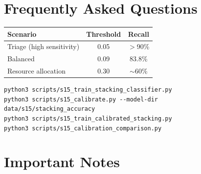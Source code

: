 \documentclass[11pt,a4paper]{article}
\renewcommand{\arraystretch}{1.3}
\begin{document}
\section{Frequently Asked Questions}

\begin{tcolorbox}[
    enhanced,
    colback=white,
    colframe=secondary,
    title={\faQuestionCircle\hspace{0.5em}Operating Threshold Selection},
    fonttitle=\bfseries\color{white},
    colbacktitle=secondary,
]
\begin{center}
\renewcommand{\arraystretch}{1.3}
\begin{tabular}{lcc}
\toprule
\textbf{Scenario} & \textbf{Threshold} & \textbf{Recall} \\
\midrule
Triage (high sensitivity) & 0.05 & $>$90\% \\
Balanced & 0.09 & 83.8\% \\
Resource allocation & 0.30 & $\sim$60\% \\
\bottomrule
\end{tabular}
\end{center}
\end{tcolorbox}

\vspace{0.5cm}

\begin{tcolorbox}[
    enhanced,
    colback=white,
    colframe=accent,
    title={\faWrench\hspace{0.5em}Reproduce Calibration Optimization},
    fonttitle=\bfseries\color{white},
    colbacktitle=accent,
]
\begin{lstlisting}
python3 scripts/s15_train_stacking_classifier.py
python3 scripts/s15_calibrate.py --model-dir data/s15/stacking_accuracy
python3 scripts/s15_train_calibrated_stacking.py
python3 scripts/s15_calibration_comparison.py
\end{lstlisting}
\end{tcolorbox}

\section{Important Notes}
\end{document}
